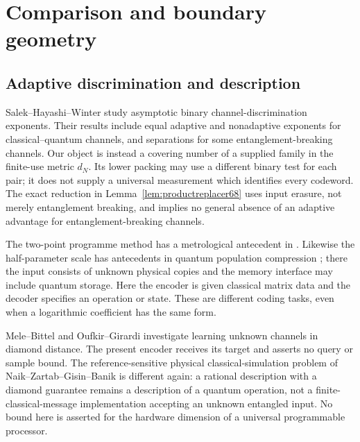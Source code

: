 \section{Comparison and boundary geometry}
\subsection{Adaptive discrimination and description}
Salek--Hayashi--Winter \cite[Sections~II--V]{SHW68} study asymptotic
binary channel-discrimination exponents. Their results include equal
adaptive and nonadaptive exponents for classical--quantum channels,
and separations for some entanglement-breaking channels. Our object
is instead a covering number of a supplied family in the finite-use
metric $d_N$. Its lower packing may use a different binary test for
each pair; it does not supply a universal measurement which identifies
every codeword. The exact reduction in
Lemma~\ref{lem:productreplacer68} uses input erasure, not merely
entanglement breaking, and implies no general absence of an adaptive
advantage for entanglement-breaking channels.

The two-point programme method has a metrological antecedent in
\cite{DKG67}. Likewise the half-parameter scale has antecedents in
quantum population compression \cite{YBCH68}; there the input consists
of unknown physical copies and the memory interface may include
quantum storage. Here the encoder is given classical matrix data and
the decoder specifies an operation or state. These are different
coding tasks, even when a logarithmic coefficient has the same form.

Mele--Bittel \cite{MB67} and Oufkir--Girardi \cite{OG67} investigate
learning unknown channels in diamond distance. The present encoder
receives its target and asserts no query or sample bound. The
reference-sensitive physical classical-simulation problem of
Naik--Zartab--Gisin--Banik \cite{NZGB67} is different again: a rational
description with a diamond guarantee remains a description of a
quantum operation, not a finite-classical-message implementation
accepting an unknown entangled input. No bound here is asserted for
the hardware dimension of a universal programmable processor.

